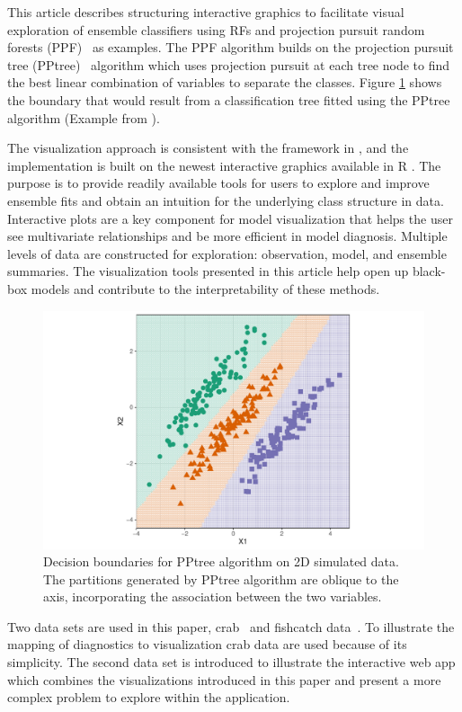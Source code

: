 \documentclass[smallextended,natbib]{svjour3}\usepackage[]{graphicx}\usepackage[]{xcolor}
\makeatletter
\def\maxwidth{ %
  \ifdim\Gin@nat@width>\linewidth
    \linewidth
  \else
    \Gin@nat@width
  \fi
}
\newenvironment{knitrout}{}{} %
\makeatother
\begin{document}
This article describes structuring interactive graphics to facilitate visual exploration of ensemble classifiers using RFs and projection pursuit random forests (PPF)~\citep{da2021projection} as examples. The PPF algorithm builds on the projection pursuit tree (PPtree)~\citep{lee2013pptree} algorithm which uses projection pursuit at each tree node to find the best linear combination of variables to separate the classes. Figure \ref{bounds} shows the boundary that would result from a classification tree fitted using the PPtree algorithm (Example from \citep{da2021projection}).

The visualization approach is consistent with the framework in \cite{wickham2015visualizing}, and the implementation is built on the newest interactive graphics available in R \citep{RCore}. The purpose is to provide readily available tools for users to explore and improve ensemble fits and obtain an intuition for the underlying class structure in data. Interactive plots are a key component for model visualization that helps the user see multivariate relationships and be more efficient in model diagnosis. Multiple levels of data are constructed for exploration: observation, model, and ensemble summaries.
The visualization tools presented in this article help open up black-box models and contribute to the interpretability of these methods.



\begin{figure}[!t]
\begin{knitrout}
\color{fgcolor}
\includegraphics[width=\maxwidth]{boundss-1} 
\end{knitrout}
 \vspace*{-0.3cm}
 \caption{Decision boundaries for PPtree algorithm on 2D simulated data. The partitions generated by PPtree algorithm are oblique to the axis, incorporating the association between the two variables.\label{bounds}}
\end{figure}
Two data sets are used in this paper, crab~\citep{CM74} and fishcatch data~\citep{fishcatch}. To illustrate the mapping of diagnostics to visualization crab data are used because of its simplicity. The second data set is introduced to illustrate the interactive web app which combines the visualizations introduced in this paper and present a more complex problem to explore within the application.
\end{document}
